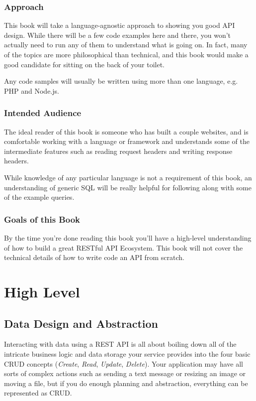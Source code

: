\documentclass{book}
\begin{document}
\subsection{Approach}

This book will take a language-agnostic approach to showing you good API design. While there will be a few code examples here and there, you won't actually need to run any of them to understand what is going on. In fact, many of the topics are more philosophical than technical, and this book would make a good candidate for sitting on the back of your toilet.

Any code samples will usually be written using more than one language, e.g. PHP and Node.js.

\subsection{Intended Audience}

The ideal reader of this book is someone who has built a couple websites, and is comfortable working with a language or framework and understands some of the intermediate features such as reading request headers and writing response headers.

While knowledge of any particular language is not a requirement of this book, an understanding of generic SQL will be really helpful for following along with some of the example queries.

\subsection{Goals of this Book}

By the time you're done reading this book you'll have a high-level understanding of how to build a great RESTful API Ecosystem. This book will not cover the technical details of how to write code an API from scratch.


\chapter{High Level}

\section{Data Design and Abstraction}

Interacting with data using a REST API is all about boiling down all of the intricate business logic and data storage your service provides into the four basic CRUD concepts (\emph{Create}, \emph{Read}, \emph{Update}, \emph{Delete}). Your application may have all sorts of complex actions such as sending a text message or resizing an image or moving a file, but if you do enough planning and abstraction, everything can be represented as CRUD.
\end{document}
